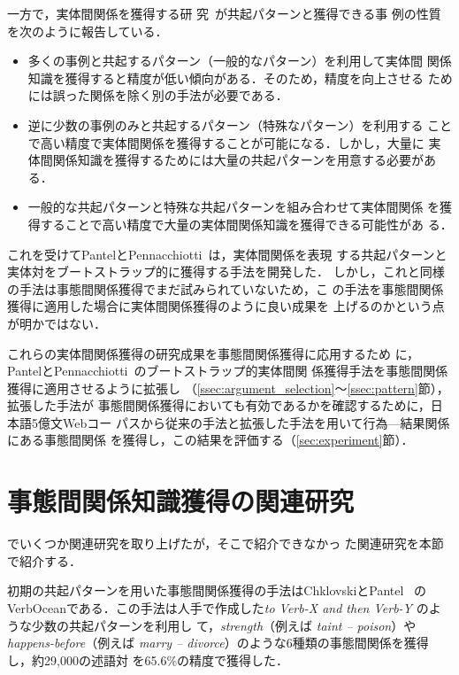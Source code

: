 \documentclass[japanese]{jnlp_1.4}
\begin{document}
一方で，実体間関係を獲得する研
究~\cite[etc.]{ravichandran:02,pantel2006}が共起パターンと獲得できる事
例の性質を次のように報告している．
\begin{itemize}
\item 多くの事例と共起するパターン（一般的なパターン）を利用して実体間
  関係知識を獲得すると精度が低い傾向がある．そのため，精度を向上させる
  ためには誤った関係を除く別の手法が必要である．
\item 逆に少数の事例のみと共起するパターン（特殊なパターン）を利用する
  ことで高い精度で実体間関係を獲得することが可能になる．しかし，大量に
  実体間関係知識を獲得するためには大量の共起パターンを用意する必要があ
  る．
\item 一般的な共起パターンと特殊な共起パターンを組み合わせて実体間関係
  を獲得することで高い精度で大量の実体間関係知識を獲得できる可能性があ
  る．
\end{itemize}
これを受けてPantelとPennacchiotti~\cite{pantel2006}は，実体間関係を表現
する共起パターンと実体対をブートストラップ的に獲得する手法を開発した．
しかし，これと同様の手法は事態間関係獲得でまだ試みられていないため，こ
の手法を事態間関係獲得に適用した場合に実体間関係獲得のように良い成果を
上げるのかという点が明かではない．

これらの実体間関係獲得の研究成果を事態間関係獲得に応用するため
に，PantelとPennacchiotti~\cite{pantel2006}のブートストラップ的実体間関
係獲得手法を事態間関係獲得に適用させるように拡張し
（\ref{ssec:argument_selection}〜\ref{ssec:pattern}節），拡張した手法が
事態間関係獲得においても有効であるかを確認するために，日本語5億文Webコー
パスから従来の手法と拡張した手法を用いて行為—結果関係にある事態間関係
を獲得し，この結果を評価する（\ref{sec:experiment}節）．



\section{事態間関係知識獲得の関連研究}
\label{sec:related_work}

でいくつか関連研究を取り上げたが，そこで紹介できなかっ
た関連研究を本節で紹介する．

初期の共起パターンを用いた事態間関係獲得の手法はChklovskiとPantel
~\cite{chklovski}のVerbOceanである．この手法は人手で作成した\textit{to
  Verb-X and then Verb-Y} のような少数の共起パターンを利用し
て，\textit{strength}（例えば \textit{taint --
  poison}）や \textit{happens-before}（例えば \textit{marry --
  divorce}）のような6種類の事態間関係を獲得し，約29,000の述語対
を65.6\%の精度で獲得した．
\end{document}
